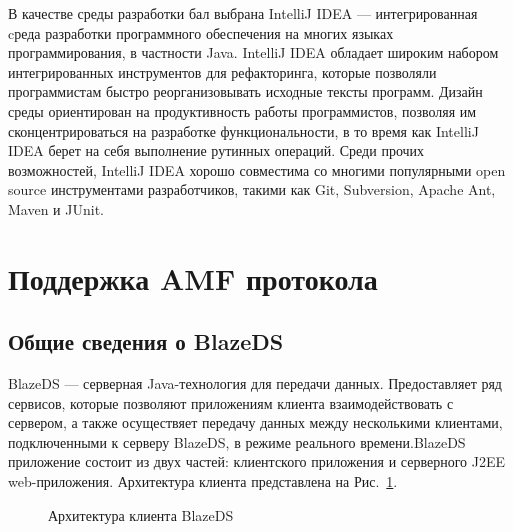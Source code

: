 В качестве среды разработки бал выбрана IntelliJ IDEA --- интегрированная cреда разработки программного обеспечения на
многих языках программирования, в частности Java. IntelliJ IDEA обладает широким набором интегрированных инструментов
для рефакторинга, которые позволяли программистам быстро реорганизовывать исходные тексты программ. Дизайн среды
ориентирован на продуктивность работы программистов, позволяя им сконцентрироваться на разработке функциональности,
в то время как IntelliJ IDEA берет на себя выполнение рутинных операций. Среди прочих возможностей, IntelliJ IDEA
хорошо совместима со многими популярными open source инструментами разработчиков, такими как Git, Subversion,
Apache Ant, Maven и JUnit\cite{idea-book}.

\section{Поддержка AMF протокола}

\subsection{Общие сведения о BlazeDS}

BlazeDS --- серверная Java-технология для передачи данных. Предоставляет ряд сервисов, которые позволяют приложениям
клиента взаимодействовать с сервером, а также осуществяет передачу данных между несколькими клиентами, подключенными 
к серверу BlazeDS, в режиме реального времени.BlazeDS приложение состоит из двух частей: клиентского приложения и серверного 
J2EE web-приложения. Архитектура клиента представлена на Рис.~\ref{ris:blazeDSClient.png}.

\begin{figure}[ht]
\caption{Архитектура клиента BlazeDS}
\label{ris:blazeDSClient.png}
\end{figure}

